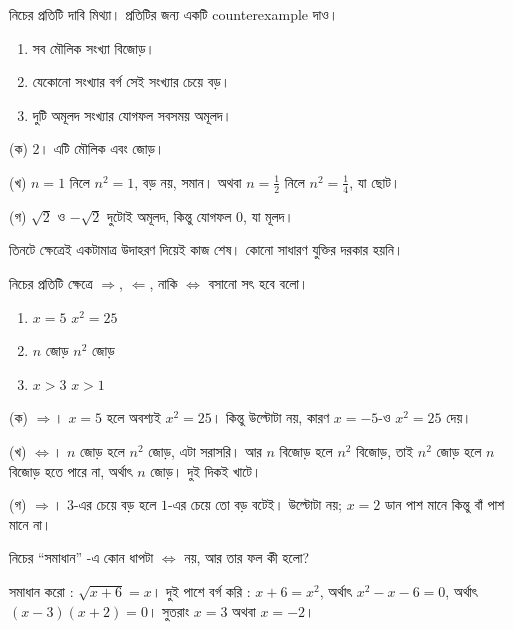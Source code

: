 \documentclass[11pt]{article}
\begin{document}
 নিচের প্রতিটি দাবি মিথ্যা। প্রতিটির জন্য একটি counterexample দাও।

\begin{enumerate}
  \item সব মৌলিক সংখ্যা বিজোড়।
  \item যেকোনো সংখ্যার বর্গ সেই সংখ্যার চেয়ে বড়।
  \item দুটি অমূলদ সংখ্যার যোগফল সবসময় অমূলদ।
\end{enumerate}

\begin{sol}
(ক) $2$। এটি মৌলিক এবং জোড়।

(খ) $n = 1$ নিলে $n^2 = 1$, বড় নয়, সমান। অথবা $n = \tfrac{1}{2}$ নিলে
$n^2 = \tfrac{1}{4}$, যা ছোট।

(গ) $\sqrt{2}$ ও $-\sqrt{2}$ দুটোই অমূলদ, কিন্তু যোগফল $0$, যা মূলদ।

তিনটে ক্ষেত্রেই একটামাত্র উদাহরণ দিয়েই কাজ শেষ। কোনো সাধারণ যুক্তির দরকার হয়নি।
\end{sol}

 নিচের প্রতিটি ক্ষেত্রে $\Rightarrow$, $\Leftarrow$, নাকি
$\Leftrightarrow$ বসানো সৎ হবে বলো।

\begin{enumerate}
  \item $x = 5$ \qquad \framebox[1.4cm]{} \qquad $x^2 = 25$
  \item $n$ জোড় \qquad \framebox[1.4cm]{} \qquad $n^2$ জোড়
  \item $x > 3$ \qquad \framebox[1.4cm]{} \qquad $x > 1$
\end{enumerate}

\begin{sol}
(ক) $\Rightarrow$। $x = 5$ হলে অবশ্যই $x^2 = 25$। কিন্তু উল্টোটা নয়, কারণ
$x = -5$-ও $x^2 = 25$ দেয়।

(খ) $\Leftrightarrow$। $n$ জোড় হলে $n^2$ জোড়, এটা সরাসরি। আর $n$ বিজোড় হলে
$n^2$ বিজোড়, তাই $n^2$ জোড় হলে $n$ বিজোড় হতে পারে না, অর্থাৎ $n$ জোড়। দুই দিকই খাটে।

(গ) $\Rightarrow$। $3$-এর চেয়ে বড় হলে $1$-এর চেয়ে তো বড় বটেই। উল্টোটা নয়;
$x = 2$ ডান পাশ মানে কিন্তু বাঁ পাশ মানে না।
\end{sol}

 নিচের ``সমাধান'' -এ কোন ধাপটা $\Leftrightarrow$ নয়, আর তার ফল কী হলো?

\smallskip
\noindent
সমাধান করো : $\sqrt{x + 6} = x$।
দুই পাশে বর্গ করি : $x + 6 = x^2$, অর্থাৎ $x^2 - x - 6 = 0$, অর্থাৎ
$(x-3)(x+2) = 0$। সুতরাং $x = 3$ অথবা $x = -2$।
\end{document}
